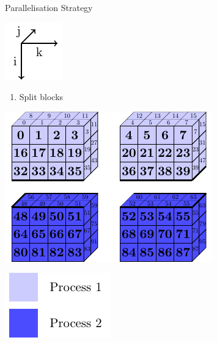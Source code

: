 \documentclass{beamer}
\begin{document}
\begin{frame}{Parallelisation Strategy}
 \begin{minipage}{.3\textwidth}
 \includegraphics[width=.4\textwidth]{SplitConcat3D/Axes}
 \vspace{4em}
 
  \begin{enumerate}
   \item Split blocks
  \end{enumerate}
  
  \vspace{4em}
 \end{minipage}
 \begin{minipage}{.65\textwidth}
  \includegraphics[width=.8\textwidth]{SplitConcat3D/SendBlocksDistrib1_2}
  
  \vspace{1em}
  
  \hfill\includegraphics[width=.3\textwidth]{SplitConcat3D/Legend}
 \end{minipage}
\end{frame}
\end{document}
